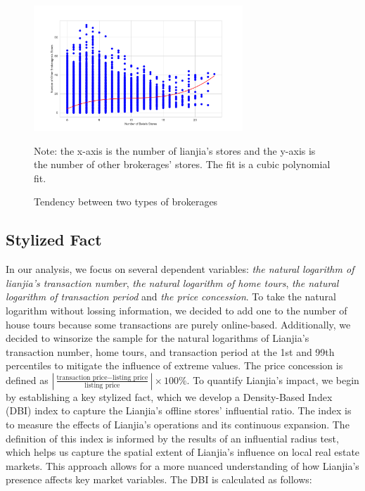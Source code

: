 \documentclass[11pt]{article}
\begin{document}
\begin{figure}
    \centering
    \includegraphics[width=0.7\textwidth]{../figures/scatter_plot_with_two_brokerages.pdf}
    \caption{Tendency between two types of brokerages}
    \label{fig:same_distribution}
    Note: the x-axis is the number of lianjia's stores and the y-axis is the number of other brokerages' stores. The fit is a cubic polynomial fit.
\end{figure}


\subsection{Stylized Fact} \label{subsec:stylized_fact}

In our analysis, we focus on several dependent variables: \emph{the natural logarithm of lianjia's transaction number}, \emph{the natural logarithm of home tours}, \emph{the natural logarithm of transaction period} and \emph{the price concession}. To take the natural logarithm without lossing information, we decided to add one to the number of house tours because some transactions are purely online-based. Additionally, we decided to winsorize the sample for the natural logarithms of Lianjia's transaction number, home tours, and transaction period at the 1st and 99th percentiles to mitigate the influence of extreme values. The price concession is defined as $|\frac{\text{transaction price} - \text{listing price}}{\text{listing price}}| \times 100\%$. To quantify Lianjia's impact, we begin by establishing a key stylized fact, which we develop a Density-Based Index (DBI) index to capture the Lianjia's offline stores' influential ratio. The index is to measure the effects of Lianjia's operations and its continuous expansion. The definition of this index is informed by the results of an influential radius test, which helps us capture the spatial extent of Lianjia's influence on local real estate markets. This approach allows for a more nuanced understanding of how Lianjia's presence affects key market variables. The DBI is calculated as follows:
\end{document}
